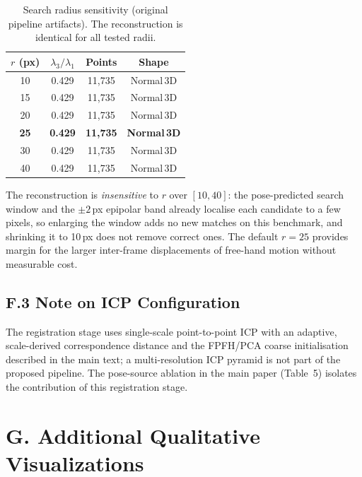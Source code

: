 \documentclass[review]{elsarticle}
\begin{document}
\begin{table}[h]
\centering
\caption{Search radius sensitivity (original pipeline artifacts). The reconstruction is identical for all tested radii.}
\label{tab:supp_search_radius}
\setlength{\tabcolsep}{4pt}
\renewcommand{\arraystretch}{1.05}
\begin{tabular}{cccc}
\toprule
$r$ (px) & $\lambda_3/\lambda_1$ & Points & Shape \\
\midrule
10 & 0.429 & 11{,}735 & Normal\,3D \\
15 & 0.429 & 11{,}735 & Normal\,3D \\
20 & 0.429 & 11{,}735 & Normal\,3D \\
\textbf{25} & \textbf{0.429} & \textbf{11{,}735} & \textbf{Normal\,3D} \\
30 & 0.429 & 11{,}735 & Normal\,3D \\
40 & 0.429 & 11{,}735 & Normal\,3D \\
\bottomrule
\end{tabular}
\end{table}

The reconstruction is \emph{insensitive} to $r$ over $[10, 40]$: the pose-predicted search window and the $\pm 2$\,px epipolar band already localise each candidate to a few pixels, so enlarging the window adds no new matches on this benchmark, and shrinking it to 10\,px does not remove correct ones. The default $r{=}25$ provides margin for the larger inter-frame displacements of free-hand motion without measurable cost.

\subsection*{F.3 Note on ICP Configuration}

The registration stage uses single-scale point-to-point ICP with an adaptive, scale-derived correspondence distance and the FPFH/PCA coarse initialisation described in the main text; a multi-resolution ICP pyramid is not part of the proposed pipeline. The pose-source ablation in the main paper (Table~5) isolates the contribution of this registration stage.

\section*{G. Additional Qualitative Visualizations}
\end{document}
